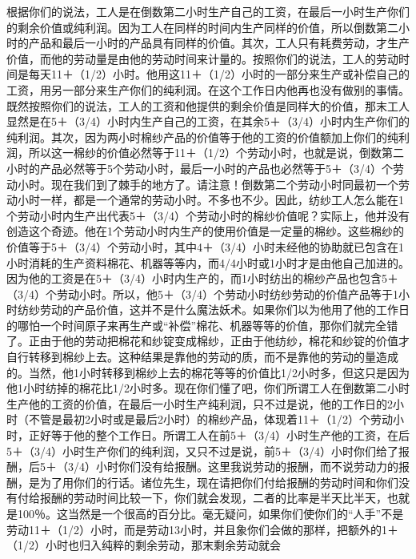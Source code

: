 \documentclass{ctexbook}
\begin{document}
    根据你们的说法，工人是在倒数第二小时生产自己的工资，在最后一小时生产你们的剩余价值或纯利润。因为工人在同样的时间内生产同样的价值，所以倒数第二小时的产品和最后一小时的产品具有同样的价值。其次，工人只有耗费劳动，才生产价值，而他的劳动量是由他的劳动时间来计量的。按照你们的说法，工人的劳动时间是每天11＋（1/2）小时。他用这11＋（1/2）小时的一部分来生产或补偿自己的工资，用另一部分来生产你们的纯利润。在这个工作日内他再也没有做别的事情。既然按照你们的说法，工人的工资和他提供的剩余价值是同样大的价值，那末工人显然是在5＋（3/4）小时内生产自己的工资，在其余5＋（3/4）小时内生产你们的纯利润。其次，因为两小时棉纱产品的价值等于他的工资的价值额加上你们的纯利润，所以这一棉纱的价值必然等于11＋（1/2）个劳动小时，也就是说，倒数第二小时的产品必然等于5个劳动小时，最后一小时的产品也必然等于5＋（3/4）个劳动小时。现在我们到了棘手的地方了。请注意！倒数第二个劳动小时同最初一个劳动小时一样，都是一个通常的劳动小时。不多也不少。因此，纺纱工人怎么能在1个劳动小时内生产出代表5＋（3/4）个劳动小时的棉纱价值呢？实际上，他并没有创造这个奇迹。他在1个劳动小时内生产的使用价值是一定量的棉纱。这些棉纱的价值等于5＋（3/4）个劳动小时，其中4＋（3/4）小时未经他的协助就已包含在1小时消耗的生产资料棉花、机器等等内，而4/4小时或1小时才是由他自己加进的。因为他的工资是在5＋（3/4）小时内生产的，而1小时纺出的棉纱产品也包含5＋（3/4）个劳动小时。所以，他5＋（3/4）个劳动小时纺纱劳动的价值产品等于1小时纺纱劳动的产品价值，这并不是什么魔法妖术。如果你们以为他用了他的工作日的哪怕一个时间原子来再生产或“补偿”棉花、机器等等的价值，那你们就完全错了。正由于他的劳动把棉花和纱锭变成棉纱，正由于他纺纱，棉花和纱锭的价值才自行转移到棉纱上去。这种结果是靠他的劳动的质，而不是靠他的劳动的量造成的。当然，他1小时转移到棉纱上去的棉花等等的价值比1/2小时多，但这只是因为他1小时纺掉的棉花比1/2小时多。现在你们懂了吧，你们所谓工人在倒数第二小时生产他的工资的价值，在最后一小时生产纯利润，只不过是说，他的工作日的2小时（不管是最初2小时或是最后2小时）的棉纱产品，体现着11＋（1/2）个劳动小时，正好等于他的整个工作日。所谓工人在前5＋（3/4）小时生产他的工资，在后5＋（3/4）小时生产你们的纯利润，又只不过是说，前5＋（3/4）小时你们给了报酬，后5＋（3/4）小时你们没有给报酬。这里我说劳动的报酬，而不说劳动力的报酬，是为了用你们的行话。诸位先生，现在请把你们付给报酬的劳动时间和你们没有付给报酬的劳动时间比较一下，你们就会发现，二者的比率是半天比半天，也就是100％。这当然是一个很高的百分比。毫无疑问，如果你们使你们的“人手”不是劳动11＋（1/2）小时，而是劳动13小时，并且象你们会做的那样，把额外的1＋（1/2）小时也归入纯粹的剩余劳动，那末剩余劳动就会 
\end{document}
